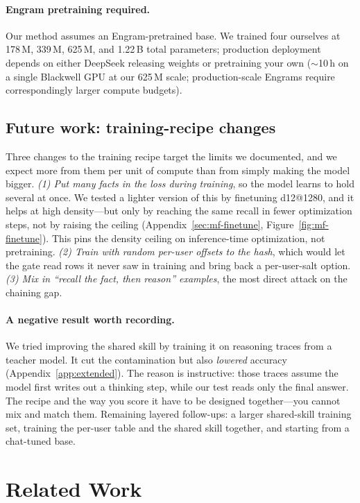 \documentclass[11pt]{article}
\begin{document}
\paragraph{Engram pretraining required.}
Our method assumes an Engram-pretrained base. We trained four
ourselves at 178\,M, 339\,M, 625\,M, and 1.22\,B total
parameters; production deployment depends on either DeepSeek
releasing weights or pretraining your own ($\sim$10\,h on a
single Blackwell GPU at our 625\,M scale; production-scale
Engrams require correspondingly larger compute budgets).

\subsection{Future work: training-recipe changes}
\label{sec:future}

Three changes to the training recipe target the limits we
documented, and we expect more from them per unit of compute than
from simply making the model bigger. \emph{(1) Put many facts in the
loss during training}, so the model learns to hold several at once.
We tested a lighter version of this by finetuning d12@1280, and it
helps at high density---but only by reaching the same recall in fewer
optimization steps, not by raising the ceiling
(Appendix~\ref{sec:mf-finetune}, Figure~\ref{fig:mf-finetune}). This
pins the density ceiling on inference-time optimization, not
pretraining. \emph{(2) Train with random per-user offsets to the
hash}, which would let the gate read rows it never saw in training and
bring back a per-user-salt option. \emph{(3) Mix in ``recall the fact,
then reason'' examples}, the most direct attack on the chaining gap.

\paragraph{A negative result worth recording.} We tried improving the
shared skill by training it on reasoning traces from a teacher model.
It cut the contamination but also \emph{lowered} accuracy
(Appendix~\ref{app:extended}). The reason is instructive: those traces
assume the model first writes out a thinking step, while our test
reads only the final answer. The recipe and the way you score it have
to be designed together---you cannot mix and match them. Remaining
layered follow-ups: a larger shared-skill training set, training the
per-user table and the shared skill together, and starting from a
chat-tuned base.

\section{Related Work}
\label{sec:related-work}
\end{document}
